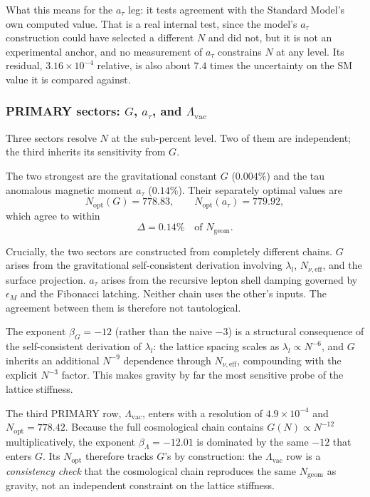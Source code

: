 \documentclass[10pt,a4paper]{article}
\begin{document}
What this means for the $a_\tau$ leg: it tests agreement with the Standard
Model's own computed value. That is a real internal test, since the model's
$a_\tau$ construction could have selected a different $N$ and did not, but
it is not an experimental anchor, and no measurement of $a_\tau$ constrains
$N$ at any level. Its residual, $3.16 \times 10^{-4}$ relative, is also
about $7.4$ times the uncertainty on the SM value it is compared against.

\subsubsection{PRIMARY sectors: $G$, $a_\tau$, and $\Lambda_{\text{vac}}$}

Three sectors resolve $N$ at the sub-percent level. Two of them are
independent; the third inherits its sensitivity from $G$.

The two strongest are the gravitational constant $G$ ($0.004\%$) and the
tau anomalous magnetic moment $a_\tau$ ($0.14\%$). Their separately
optimal values are
\begin{equation}
	N_{\text{opt}}(G) = 778.83, \qquad
	N_{\text{opt}}(a_\tau) = 779.92,
\end{equation}
which agree to within
\begin{equation}
	\Delta = 0.14\% \quad \text{of } N_{\text{geom}}.
\end{equation}

Crucially, the two sectors are constructed from completely different
chains. $G$ arises from the gravitational self-consistent derivation
involving $\lambda_l$, $N_{\nu,\text{eff}}$, and the surface projection.
$a_\tau$ arises from the recursive lepton shell damping governed by
$\epsilon_M$ and the Fibonacci latching. Neither chain uses the other's
inputs. The agreement between them is therefore not tautological.

The exponent $\beta_G = -12$ (rather than the naive $-3$) is a structural
consequence of the self-consistent derivation of $\lambda_l$: the lattice
spacing scales as $\lambda_l \propto N^{-6}$, and $G$ inherits an
additional $N^{-9}$ dependence through $N_{\nu,\text{eff}}$, compounding
with the explicit $N^{-3}$ factor. This makes gravity by far the most
sensitive probe of the lattice stiffness.

The third PRIMARY row, $\Lambda_{\text{vac}}$, enters with a resolution of
$4.9 \times 10^{-4}$ and $N_{\text{opt}} = 778.42$. Because the full
cosmological chain contains $G(N) \propto N^{-12}$ multiplicatively, the
exponent $\beta_{\Lambda} = -12.01$ is dominated by the same $-12$ that
enters $G$. Its $N_{\text{opt}}$ therefore tracks $G$'s by construction:
the $\Lambda_{\text{vac}}$ row is a \emph{consistency check} that the
cosmological chain reproduces the same $N_{\text{geom}}$ as gravity, not
an independent constraint on the lattice stiffness.
\end{document}
